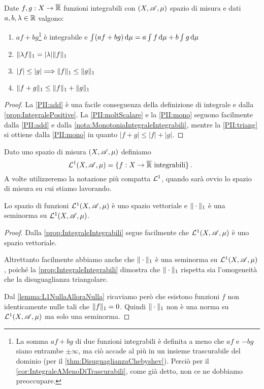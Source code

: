 \begin{proposition}\label{prop:IntegraleIntegrabili}
	Date $f,g:X\to\overline{\mathbb R}$ funzioni integrabili con $(X,\mathscr A,\mu)$ spazio di misura e dati $a,b,\lambda\in\mathbb R$ valgono:
	\begin{enumerate}
		\item $af+bg$\footnote{La somma $af+bg$ di due funzioni integrabili è definita a meno che $af$ e $-bg$ siano entrambe $\pm \infty$, ma ciò accade al più in un insieme trascurabile del dominio (per il \cref{thm:DisuguaglianzaChebyshev}). Perciò per il \cref{cor:IntegraleAMenoDiTrascurabili}, come già detto, non ce ne dobbiamo preoccupare.} è integrabile e $\int (af+bg)\,\mathrm d\mu=a\int f\,\mathrm d\mu+b\int g\,\mathrm d\mu$ \label{PII:add}
		\item $\Vert \lambda f\Vert_1=|\lambda|\Vert f\Vert_1$ \label{PII:moltScalare}
		\item $|f|\le |g|\Longrightarrow \Vert f\Vert_1\le \Vert g\Vert_1$ \label{PII:mono}
		\item $\Vert f+g\Vert_1\le\Vert f\Vert_1+\Vert g\Vert_1$ \label{PII:triang}
	\end{enumerate}
\end{proposition}
\begin{proof}
	La \ref{PII:add} è una facile conseguenza della definizione di integrale e dalla \cref{prop:IntegralePositive}.
	La \ref{PII:moltScalare} e la \ref{PII:mono} seguono facilmente dalla \ref{PII:add} e dalla \cref{nota:MonotoniaIntegraleIntegrabili}, mentre la \ref{PII:triang} si ottiene dalla \ref{PII:mono} in quanto $|f+g|\le|f|+|g|$.
\end{proof}



\begin{definition}
	Dato uno spazio di misura $(X,\mathscr A,\mu)$ definiamo
	\begin{equation*}
		\mathcal L^1(X,\mathscr A,\mu)=\{ f:X\to\overline{\mathbb R} \text{ integrabili} \}\, \text{. }
	\end{equation*}
	A volte utilizzeremo la notazione più compatta $\mathcal L^1$, quando sarà ovvio lo spazio di misura su cui stiamo lavorando.
\end{definition}


\begin{proposition}\label{prop:L1VettorialeConSeminorma}
	Lo spazio di funzioni $\mathcal L^1(X,\mathscr A,\mu)$ è uno spazio vettoriale e $\Vert \cdot\Vert_1$ è una seminorma su $\mathcal L^1(X,\mathscr A,\mu)$.
\end{proposition}
\begin{proof}
	Dalla \cref{prop:IntegraleIntegrabili} segue facilmente che $\mathcal L^1(X,\mathscr A,\mu)$ è uno spazio vettoriale. 
	
	Altrettanto facilmente abbiamo anche che $\Vert \cdot\Vert_1$ è una seminorma su $\mathcal L^1(X,\mathscr A,\mu)$, poiché la \cref{prop:IntegraleIntegrabili} dimostra che $\Vert \cdot\Vert_1$ rispetta sia l'omogeneità che la disuguaglianza triangolare.
	
	Dal \cref{lemma:L1NullaAlloraNulla} ricaviamo però che esistono funzioni $f$ non identicamente nulle tali che $\Vert f\Vert_1=0$. Quindi $\Vert \cdot\Vert_1$ non è una norma su $\mathcal L^1(X,\mathscr A,\mu)$ ma solo una seminorma.
\end{proof}

